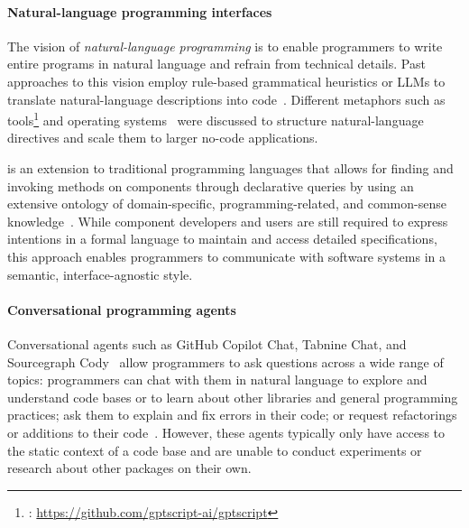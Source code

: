 \paragraph{Natural-language programming interfaces}
\label{sec:related_work/nlp}

The vision of \emph{natural-language programming} is to enable programmers to write entire programs in natural language and refrain from technical details.
Past approaches to this vision employ rule-based grammatical heuristics or LLMs to translate natural-language descriptions into code~\cite{mihalcea2006nlp}.
Different metaphors such as tools\footnote{: \url{https://github.com/gptscript-ai/gptscript}} and operating systems~\cite{mei2024aios} were discussed to structure natural-language directives and scale them to larger no-code applications.

 is an extension to traditional programming languages that allows for finding and invoking methods on components through declarative queries by using an extensive ontology of domain-specific, programming-related, and common-sense knowledge~\cite{samimi2014call}.
While component developers and users are still required to express intentions in a formal language to maintain and access detailed specifications, this approach enables programmers to communicate with software systems in a semantic, interface-agnostic style.

\paragraph{Conversational programming agents}
\label{par:related_work/interfaces/agents}

Conversational agents such as GitHub Copilot Chat, Tabnine Chat, and Sourcegraph Cody~\cite{hartman2024ai} allow programmers to ask questions across a wide range of topics:
programmers can chat with them in natural language to explore and understand code bases or to learn about other libraries and general programming practices; ask them to explain and fix errors in their code; or request refactorings or additions to their code~\cite{peter2022designing,kuramitsu2023kogi,stevens2023programmers}.
However, these agents typically only have access to the static context of a code base and are unable to conduct experiments or research about other packages on their own.
